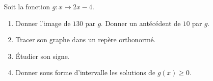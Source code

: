 
\begin{exercice}\label{exosmath-0517}

    Soit la fonction \( g\colon x\mapsto 2x-4\).
    \begin{enumerate}
        \item
            Donner l'image de \( 130\) par \( g\). Donner un antécédent de \( 10\) par \( g\).
        \item
            Tracer son graphe dans un repère orthonormé.
        \item
            Étudier son signe.
        \item
            Donner sous forme d'intervalle les solutions de \( g(x)\geq 0\).
    \end{enumerate}

\end{exercice}
